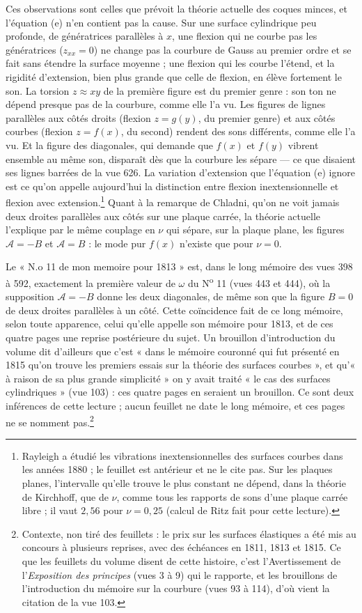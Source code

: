 \documentclass[11pt,a4paper]{article}
\begin{document}
Ces observations sont celles que prévoit la théorie actuelle des coques minces, et
l'équation (e) n'en contient pas la cause. Sur une surface cylindrique peu profonde,
de génératrices parallèles à $x$, une flexion qui ne courbe pas les génératrices
($z_{xx} = 0$) ne change pas la courbure de Gauss au premier ordre et se fait sans
étendre la surface moyenne ; une flexion qui les courbe l'étend, et la rigidité
d'extension, bien plus grande que celle de flexion, en élève fortement le son. La
torsion $z \approx xy$ de la première figure est du premier genre : son ton ne dépend
presque pas de la courbure, comme elle l'a vu. Les figures de lignes parallèles aux
côtés droits (flexion $z = g(y)$, du premier genre) et aux côtés courbes (flexion
$z = f(x)$, du second) rendent des sons différents, comme elle l'a vu. Et la figure des
diagonales, qui demande que $f(x)$ et $f(y)$ vibrent ensemble au même son, disparaît dès
que la courbure les sépare — ce que disaient ses lignes barrées de la vue 626. La
variation d'extension que l'équation (e) ignore est ce qu'on appelle aujourd'hui la
distinction entre flexion inextensionnelle et flexion avec extension.\footnote{Rayleigh
a étudié les vibrations inextensionnelles des surfaces courbes dans les années 1880 ;
le feuillet est antérieur et ne le cite pas. Sur les plaques planes, l'intervalle
qu'elle trouve le plus constant ne dépend, dans la théorie de Kirchhoff, que de $\nu$,
comme tous les rapports de sons d'une plaque carrée libre ; il vaut $2{,}56$ pour
$\nu = 0{,}25$ (calcul de Ritz fait pour cette lecture).} Quant à la remarque de
Chladni, qu'on ne voit jamais deux droites parallèles aux côtés sur une plaque carrée,
la théorie actuelle l'explique par le même couplage en $\nu$ qui sépare, sur la plaque
plane, les figures $\mathcal{A} = -B$ et $\mathcal{A} = B$ : le mode pur $f(x)$ n'existe
que pour $\nu = 0$.

Le « N.o 11 de mon memoire pour 1813 » est, dans le long mémoire des vues 398 à 592,
exactement la première valeur de $\omega$ du N\textsuperscript{o} 11 (vues 443 et 444),
où la supposition $\mathcal{A} = -B$ donne les deux diagonales, de même son que la
figure $B = 0$ de deux droites parallèles à un côté. Cette coïncidence fait de ce long
mémoire, selon toute apparence, celui qu'elle appelle son mémoire pour 1813, et de ces
quatre pages une reprise postérieure du sujet. Un brouillon d'introduction du volume
dit d'ailleurs que c'est « dans le mémoire couronné qui fut présenté en 1815 qu'on
trouve les premiers essais sur la théorie des surfaces courbes », et qu'« à raison de
sa plus grande simplicité » on y avait traité « le cas des surfaces cylindriques »
(vue 103) : ces quatre pages en seraient un brouillon. Ce sont deux inférences de cette
lecture ; aucun feuillet ne date le long mémoire, et ces pages ne se nomment
pas.\footnote{Contexte, non tiré des feuillets : le prix sur les surfaces
élastiques a été mis au concours à plusieurs reprises, avec des échéances en 1811, 1813
et 1815. Ce que les feuillets du volume disent de cette histoire, c'est l'Avertissement
de l'\emph{Exposition des principes} (vues 3 à 9) qui le rapporte, et les brouillons de l'introduction du mémoire sur la courbure (vues 93 à 114),
d'où vient la citation de la vue 103.}
\end{document}
